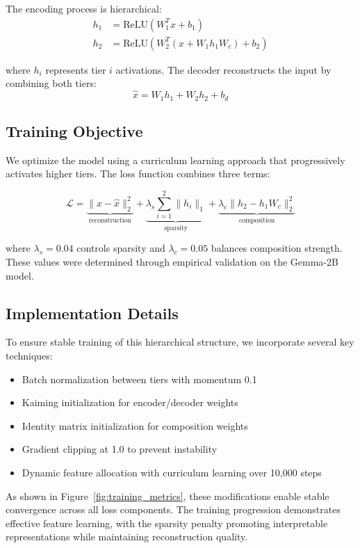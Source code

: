 \documentclass{article} %
\begin{document}
The encoding process is hierarchical:
\begin{align}
    h_1 &= \text{ReLU}(W_1^T x + b_1) \\
    h_2 &= \text{ReLU}(W_2^T(x + W_1 h_1 W_c) + b_2)
\end{align}

where $h_i$ represents tier $i$ activations. The decoder reconstructs the input by combining both tiers:
\begin{equation}
    \hat{x} = W_1 h_1 + W_2 h_2 + b_d
\end{equation}

\subsection{Training Objective}
We optimize the model using a curriculum learning approach that progressively activates higher tiers. The loss function combines three terms:

\begin{equation}
    \mathcal{L} = \underbrace{\|x - \hat{x}\|_2^2}_{\text{reconstruction}} + \underbrace{\lambda_s\sum_{i=1}^2\|h_i\|_1}_{\text{sparsity}} + \underbrace{\lambda_c\|h_2 - h_1W_c\|_2^2}_{\text{composition}}
\end{equation}

where $\lambda_s=0.04$ controls sparsity and $\lambda_c=0.05$ balances composition strength. These values were determined through empirical validation on the Gemma-2B model.

\subsection{Implementation Details}
To ensure stable training of this hierarchical structure, we incorporate several key techniques:

\begin{itemize}
    \item Batch normalization between tiers with momentum 0.1
    \item Kaiming initialization for encoder/decoder weights
    \item Identity matrix initialization for composition weights
    \item Gradient clipping at 1.0 to prevent instability
    \item Dynamic feature allocation with curriculum learning over 10,000 steps
\end{itemize}

As shown in Figure~\ref{fig:training_metrics}, these modifications enable stable convergence across all loss components. The training progression demonstrates effective feature learning, with the sparsity penalty promoting interpretable representations while maintaining reconstruction quality.
\end{document}
